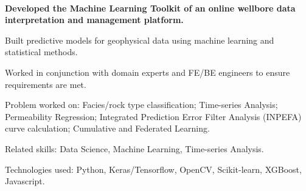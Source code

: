 \\
\begin{xitemize}
    \item \textbf{Developed the Machine Learning Toolkit of an online wellbore data interpretation and management platform.}
    \begin{zitemize}
        \item Built predictive models for geophysical data using machine learning and statistical methods.
        \item Worked in conjunction with domain experts and FE/BE engineers to ensure requirements are met.
        \item Problem worked on: Facies/rock type classification; Time-series Analysis; Permeability Regression; Integrated Prediction Error Filter Analysis (INPEFA) curve calculation; Cumulative and Federated Learning.
    \end{zitemize}
    \item Related skills: Data Science, Machine Learning, Time-series Analysis.
    \item Technologies used: Python, Keras/Tensorflow, OpenCV, Scikit-learn, XGBoost, Javascript.
\end{xitemize}

